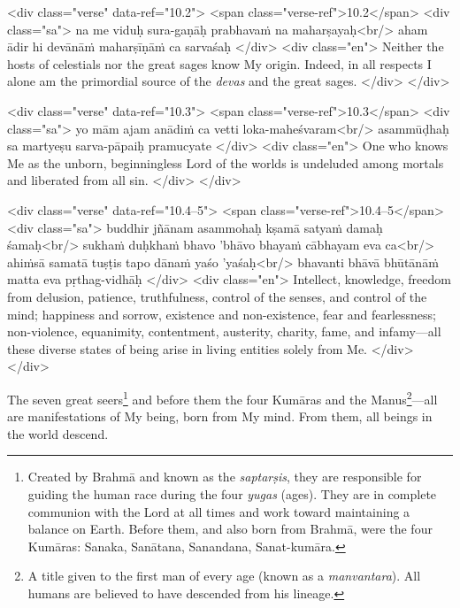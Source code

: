 \begin{html}
<div class="verse" data-ref="10.2">
  <span class="verse-ref">10.2</span>
  <div class="sa">
    na me viduḥ sura-gaṇāḥ prabhavaṁ na maharṣayaḥ<br/>
    aham ādir hi devānāṁ maharṣīṇāṁ ca sarvaśaḥ
  </div>
  <div class="en">
    Neither the hosts of celestials nor the great sages know My origin. Indeed, in all respects I alone am the primordial source of the \textit{devas} and the great sages.
  </div>
</div>
\end{html}



\begin{html}
<div class="verse" data-ref="10.3">
  <span class="verse-ref">10.3</span>
  <div class="sa">
    yo mām ajam anādiṁ ca vetti loka-maheśvaram<br/>
    asammūḍhaḥ sa martyeṣu sarva-pāpaiḥ pramucyate
  </div>
  <div class="en">
    One who knows Me as the unborn, beginningless Lord of the worlds is undeluded among mortals and liberated from all sin.
  </div>
</div>
\end{html}



\begin{html}
<div class="verse" data-ref="10.4–5">
  <span class="verse-ref">10.4–5</span>
  <div class="sa">
    buddhir jñānam asammohaḥ kṣamā satyaṁ damaḥ śamaḥ<br/>
    sukhaṁ duḥkhaṁ bhavo ’bhāvo bhayaṁ cābhayam eva ca<br/>
    ahiṁsā samatā tuṣṭis tapo dānaṁ yaśo ’yaśaḥ<br/>
    bhavanti bhāvā bhūtānāṁ matta eva pṛthag-vidhāḥ
  </div>
  <div class="en">
    Intellect, knowledge, freedom from delusion, patience, truthfulness, control of the senses, and control of the mind; happiness and sorrow, existence and non-existence, fear and fearlessness; non-violence, equanimity, contentment, austerity, charity, fame, and infamy---all these diverse states of being arise in living entities solely from Me.
  </div>
</div>
\end{html}


{The seven great seers\footnote{Created by Brahmā and known as the \textit{saptarṣis}, they are responsible for guiding the human race during the four \textit{yugas} (ages). They are in complete communion with the Lord at all times and work toward maintaining a balance on Earth. Before them, and also born from Brahmā, were the four Kumāras: Sanaka, Sanātana, Sanandana, Sanat-kumāra.} and before them the four Kumāras and the Manus\footnote{A title given to the first man of every age (known as a \textit{manvantara}). All humans are believed to have descended from his lineage.
}---all are manifestations of My being, born from My mind. From them, all beings in the world descend.}


